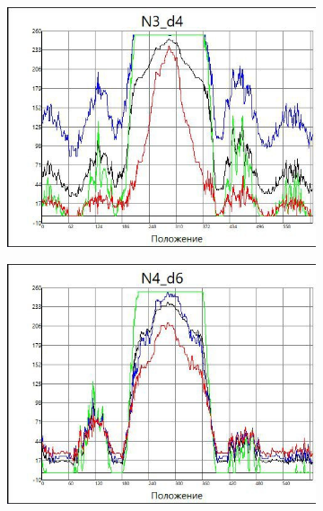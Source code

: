 \begin{figure}[h]
\begin{subfigure}{.5\textwidth}
        \centering
        \includegraphics[trim={0 0 0 0},clip,width=\textwidth]{Ex_1/n3.jpg}
        \caption{}
        \label{n3}
    \end{subfigure}
    \begin{subfigure}{.5\textwidth}
        \centering
        \includegraphics[trim={0 0 0 0},clip,width=\textwidth]{Ex_1/n4.jpg}
        \caption{}
        \label{n4}
    \end{subfigure}
\end{figure}







